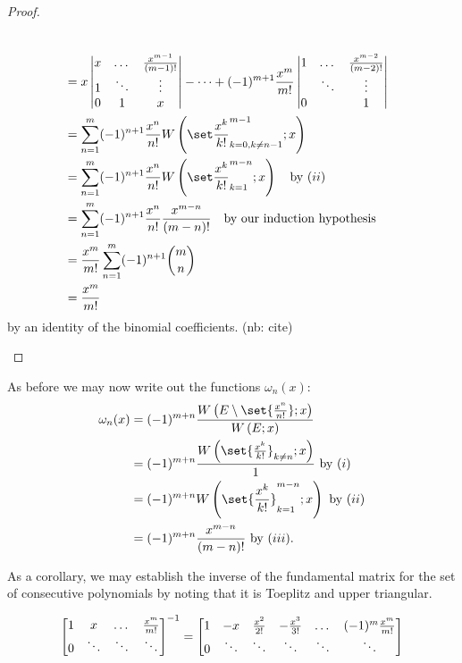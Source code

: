 \documentclass{article}
\begin{document}
\begin{proof}
\begin{description}
\begin{align*}
\\
& = x \begin{vmatrix} x & \dots & \poly{m-1} \\ 1 & \ddots & \vdots \\ 0 & 1 & x \end{vmatrix} - \dots + (-1)^{m+1} \Poly{m} \begin{vmatrix} 1 & \dots & \poly{m-2} \\  & \ddots & \vdots \\ 0 &  & 1 \end{vmatrix} \\
& = \sum_{n=1}^m (-1)^{n+1} \Poly{n} \Wpoly{k=0,k \neq n-1}{m-1} \\
& = \sum_{n=1}^m (-1)^{n+1} \Poly{n} \Wpoly{k=1}{m-n} \quad \text{by $(ii)$} \\
& = \sum_{n=1}^m (-1)^{n+1} \Poly{n} \poly{m-n} \quad \text{by our induction hypothesis} \\
& = \Poly{m} \sum_{n=1}^m (-1)^{n+1} \binom{m}{n} \\
& = \Poly{m}
\end{align*}
by an identity of the binomial coefficients. (nb: cite)
\end{description}
\end{proof}

As before we may now write out the functions $\omega_n(x)$:
\begin{equation*}
\begin{split}
\omega_n(x) & = (-1)^{m+n} \frac{ \W{E \setminus \set{\Poly{n}}}{x}}{\W{E}{x}} \\
			& = (-1)^{m+n} \frac{\W{\set{\Poly{k}}_{k \neq n}}{x}}{1} \ \text{by $(i)$} \\
			& = (-1)^{m+n} \W{\set{\Poly{k}}_{k=1}^{m-n}}{x} \ \text{by $(ii)$} \\
			& = (-1)^{m+n} \poly{m-n} \ \text{by $(iii)$.}
\end{split}
\end{equation*}

As a corollary, we may establish the inverse of the fundamental matrix for the set of consecutive polynomials by noting that it is Toeplitz and upper triangular.
\begin{cor} \label{cor:poly}
\begin{equation*}
\begin{bmatrix} 1 & x & \dots & \frac{x^m}{m!} \\ 0 & \ddots & \ddots & \ddots \end{bmatrix}^{-1} =
\begin{bmatrix} 1 & -x & \frac{x^2}{2!} & -\frac{x^3}{3!} & \dots & (-1)^m \frac{x^m}{m!} \\ 0 & \ddots & \ddots & \ddots & \ddots & \ddots \end{bmatrix} 
\end{equation*}
\end{cor}
\end{document}
